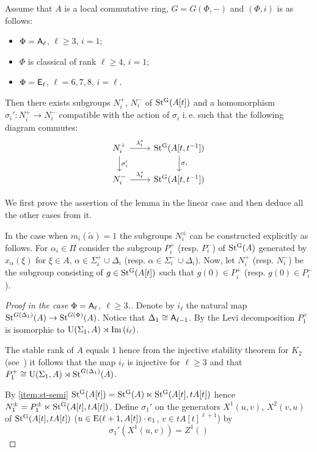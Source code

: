 \begin{lem} \label{lem:sigma}
 Assume that $A$ is a local commutative ring, $G = G(\Phi, -)$ and $(\Phi, i)$ is as follows:
 \begin{itemize}
  \item $\Phi = \mathsf{A}_\ell$, $\ell \geq 3$, $i=1$;
  \item $\Phi$ is classical of rank $\ell\geq 4$, $i=1$;
  \item $\Phi = \mathsf{E}_\ell$, $\ell=6,7,8$, $i=\ell$.
 \end{itemize}

 Then there exists subgroups $N_i^+$, $N_i^-$ of $\operatorname{St^G}(A[t])$ and a homomorphism $\sigma_i' \colon N_i^+ \to N_i^-$ 
 compatible with the action of $\sigma_i$ i.\,e. such that the following diagram commutes:
 \[\begin{tikzcd} N_i^+ \arrow[r, "\lambda_t^*"] \arrow[d, "\sigma_i'"]          &  \St(A[t, t^{-1}]) \ar[d, "\sigma_i"] \\
                  N_i^- \arrow[r, "\lambda_t^*"] &  \St(A[t, t^{-1}]) \end{tikzcd}\]

\end{lem}
We first prove the assertion of the lemma in the linear case and then deduce all the other cases from it.

In the case when $m_i(\widetilde{\alpha})=1$ the subgroups $N_i^\pm$ can be constructed explicitly as follows.
For $\alpha_i\in\Pi$ consider the subgroup $P_i^+$ (resp. $P_i^-$) of $\operatorname{St^G}(A)$ generated by $x_\alpha(\xi)$ for $\xi \in A$, $\alpha\in\Sigma_i^+ \cup \Delta_i$ (resp. $\alpha\in\Sigma_i^- \cup \Delta_i$).
Now, let $N_{i}^+$ (resp. $N_i^-$) be the subgroup consisting of $g \in \operatorname{St^G}(A[t])$ such that $g(0) \in P_i^+$ (resp. $g(0) \in P_i^-$).

\begin{proof}[Proof in the case $\Phi=\mathsf{A}_\ell$, $\ell\geq 3$.]

Denote by $i_\ell$ the natural map $\mathrm{St}^{G(\Delta_1)}(A)\to \mathrm{St}^{G(\Phi)}(A)$. Notice that $\Delta_1 \cong \mathsf{A}_{\ell-1}$.
By the Levi decomposition $P_1^+$ is isomorphic to $\operatorname{U}(\Sigma_1, A) \rtimes \operatorname{Im\,}(i_\ell)$.

The stable rank of $A$ equals $1$ hence from the injective stability theorem for $K_2$ (see~\cite[Theorem~4.1]{ST76}) it follows that the map $i_\ell$ is injective for $\ell \geq 3$
and that $P_1^+ \cong \operatorname{U}(\Sigma_1, A) \rtimes \mathrm{St}^{G(\Delta_1)}(A)$.

By \cref{item:st-semi} $\operatorname{St^G}(A[t]) = \operatorname{St^G}(A) \ltimes \operatorname{St^G}(A[t], tA[t])$ hence $N_1^\pm = P_1^\pm \ltimes \operatorname{St^G}(A[t], tA[t])$.
Define $\sigma_1'$ on the generators $X^1(u, v)$, $X^2(v, u)$ of $\operatorname{St^G}(A[t], tA[t])$ ($u \in \operatorname{E}(\ell+1, A[t])\cdot e_1$, $v\in {tA[t]}^{\ell+1}$) by
$$ \sigma_1'(X^1(u, v)) = Z^1()$$
\end{proof}
